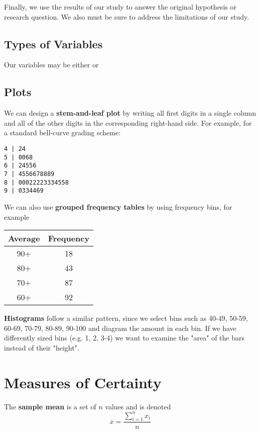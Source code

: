 \documentclass[12pt]{article}
\begin{document}
Finally, we use the results of our study to answer the original hypothesis or research question. We also must be sure to address the limitations of our study.

\subsection*{Types of Variables}
Our variables may be either   or 

\subsection*{Plots}
We can design a {\bf stem-and-leaf plot} by writing all first digits in a single column and all of the other digits in the corresponding right-hand side. For example, for a standard bell-curve grading scheme:

\begin{verbatim}
4 | 24
5 | 0068
6 | 24556
7 | 4556678889
8 | 00022223334558
9 | 0334469
\end{verbatim}

We can also use {\bf grouped frequency tables} by using frequency bins, for example

\begin{table}[ht]
\centering
\begin{tabular}{|c|c|}
  \hline
  Average & Frequency \\ \hline
  90+ & 18 \\
  80+ & 43 \\
  70+ & 87 \\
  60+ & 92 \\ \hline
  \end{tabular}
\end{table}

{\bf Histograms} follow a similar pattern, since we select bins such as 40-49, 50-59, 60-69, 70-79, 80-89, 90-100 and diagram the amount in each bin. If we have differently sized bins (e.g. 1, 2, 3-4) we want to examine the "area" of the bars instead of their "height".

\section*{Measures of Certainty}
The {\bf sample mean} is a set of $n$ values and is denoted \[ \overline{x} = \frac{\displaystyle\sum_{i=1}^n x_i}{n} \]
\end{document}
